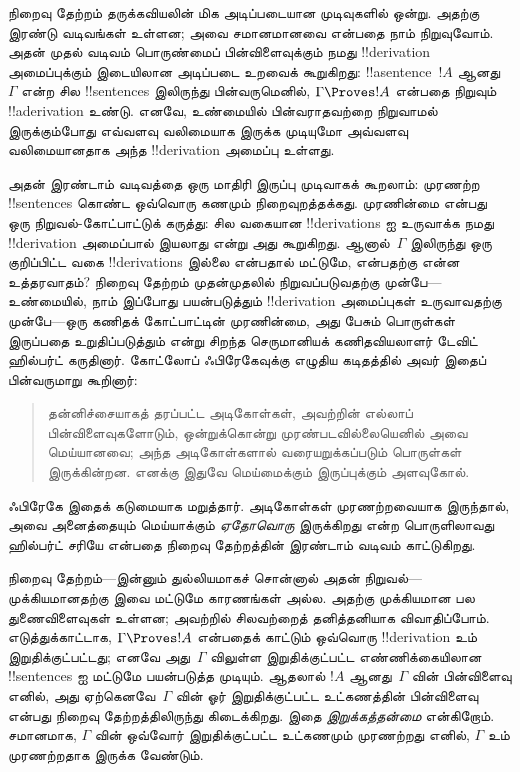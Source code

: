 \documentclass[../../../include/open-logic-section]{subfiles}
\begin{document}
      {}
      {}


நிறைவு தேற்றம் தருக்கவியலின் மிக அடிப்படையான முடிவுகளில் ஒன்று. அதற்கு
இரண்டு வடிவங்கள் உள்ளன; அவை சமானமானவை என்பதை நாம் நிறுவுவோம். அதன் முதல்
வடிவம் பொருண்மைப் பின்விளைவுக்கும் நமது !!{derivation} அமைப்புக்கும் இடையிலான
அடிப்படை உறவைக் கூறுகிறது: !!a{sentence}~$!A$ ஆனது $\Gamma$ என்ற சில
!!{sentence}s இலிருந்து பின்வருமெனில், $\Gamma \Proves !A$ என்பதை நிறுவும்
!!a{derivation} உண்டு. எனவே, உண்மையில் பின்வராதவற்றை நிறுவாமல் இருக்கும்போது
எவ்வளவு வலிமையாக இருக்க முடியுமோ அவ்வளவு வலிமையானதாக அந்த !!{derivation}
அமைப்பு உள்ளது.

அதன் இரண்டாம் வடிவத்தை ஒரு மாதிரி இருப்பு முடிவாகக் கூறலாம்: முரணற்ற
!!{sentence}s கொண்ட ஒவ்வொரு கணமும் நிறைவுறத்தக்கது. முரணின்மை என்பது ஒரு
நிறுவல்-கோட்பாட்டுக் கருத்து: சில வகையான !!{derivation}s ஐ உருவாக்க நமது
!!{derivation} அமைப்பால் இயலாது என்று அது கூறுகிறது. ஆனால்~$\Gamma$ இலிருந்து
ஒரு குறிப்பிட்ட வகை !!{derivation}s இல்லை என்பதால் மட்டுமே,
 என்பதற்கு என்ன
உத்தரவாதம்? நிறைவு தேற்றம் முதன்முதலில் நிறுவப்படுவதற்கு முன்பே---உண்மையில்,
நாம் இப்போது பயன்படுத்தும் !!{derivation} அமைப்புகள் உருவாவதற்கு முன்பே---ஒரு
கணிதக் கோட்பாட்டின் முரணின்மை, அது பேசும் பொருள்கள் இருப்பதை உறுதிப்படுத்தும்
என்று சிறந்த செருமானியக் கணிதவியலாளர் டேவிட் ஹில்பர்ட் கருதினார். கோட்லோப்
ஃபிரேகேவுக்கு எழுதிய கடிதத்தில் அவர் இதைப் பின்வருமாறு கூறினார்:
\begin{quote}
  தன்னிச்சையாகத் தரப்பட்ட அடிகோள்கள், அவற்றின் எல்லாப் பின்விளைவுகளோடும்,
  ஒன்றுக்கொன்று முரண்படவில்லையெனில் அவை மெய்யானவை; அந்த அடிகோள்களால்
  வரையறுக்கப்படும் பொருள்கள் இருக்கின்றன. எனக்கு இதுவே மெய்மைக்கும்
  இருப்புக்கும் அளவுகோல்.
\end{quote}
ஃபிரேகே இதைக் கடுமையாக மறுத்தார். அடிகோள்கள் முரணற்றவையாக இருந்தால்,
அவை அனைத்தையும் மெய்யாக்கும் \emph{ஏதோவொரு}
 இருக்கிறது என்ற பொருளிலாவது
ஹில்பர்ட் சரியே என்பதை நிறைவு தேற்றத்தின் இரண்டாம் வடிவம் காட்டுகிறது.

நிறைவு தேற்றம்---இன்னும் துல்லியமாகச் சொன்னால் அதன் நிறுவல்---முக்கியமானதற்கு
இவை மட்டுமே காரணங்கள் அல்ல. அதற்கு முக்கியமான பல துணைவிளைவுகள் உள்ளன;
அவற்றில் சிலவற்றைத் தனித்தனியாக விவாதிப்போம். எடுத்துக்காட்டாக,
$\Gamma \Proves !A$ என்பதைக் காட்டும் ஒவ்வொரு !!{derivation} உம்
இறுதிக்குட்பட்டது; எனவே அது~$\Gamma$ விலுள்ள இறுதிக்குட்பட்ட எண்ணிக்கையிலான
!!{sentence}s ஐ மட்டுமே பயன்படுத்த முடியும். ஆதலால் $!A$ ஆனது~$\Gamma$ வின்
பின்விளைவு எனில், அது ஏற்கெனவே~$\Gamma$ வின் ஓர் இறுதிக்குட்பட்ட உட்கணத்தின்
பின்விளைவு என்பது நிறைவு தேற்றத்திலிருந்து கிடைக்கிறது. இதை
\emph{இறுக்கத்தன்மை} என்கிறோம். சமானமாக, $\Gamma$ வின் ஒவ்வோர்
இறுதிக்குட்பட்ட உட்கணமும் முரணற்றது எனில், $\Gamma$ உம் முரணற்றதாக இருக்க
வேண்டும்.
\end{document}
